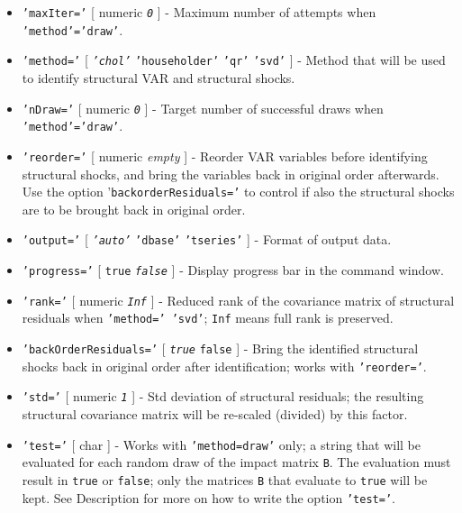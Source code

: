  \begin{itemize}
 \item
   \texttt{'maxIter='} {[} numeric \textbar{} \emph{\texttt{0}} {]} -
   Maximum number of attempts when \texttt{'method'='draw'}.
 \item
   \texttt{'method='} {[} \emph{\texttt{'chol'}} \textbar{}
   \texttt{'householder'} \textbar{} \texttt{'qr'} \textbar{}
   \texttt{'svd'} {]} - Method that will be used to identify structural
   VAR and structural shocks.
 \item
   \texttt{'nDraw='} {[} numeric \textbar{} \emph{\texttt{0}} {]} -
   Target number of successful draws when \texttt{'method'='draw'}.
 \item
   \texttt{'reorder='} {[} numeric \textbar{} \emph{empty} {]} - Reorder
   VAR variables before identifying structural shocks, and bring the
   variables back in original order afterwards. Use the option
   '\texttt{backorderResiduals='} to control if also the structural
   shocks are to be brought back in original order.
 \item
   \texttt{'output='} {[} \emph{\texttt{'auto'}} \textbar{}
   \texttt{'dbase'} \textbar{} \texttt{'tseries'} {]} - Format of output
   data.
 \item
   \texttt{'progress='} {[} \texttt{true} \textbar{}
   \emph{\texttt{false}} {]} - Display progress bar in the command
   window.
 \item
   \texttt{'rank='} {[} numeric \textbar{} \emph{\texttt{Inf}} {]} -
   Reduced rank of the covariance matrix of structural residuals when
   \texttt{'method=' 'svd'}; \texttt{Inf} means full rank is preserved.
 \item
   \texttt{'backOrderResiduals='} {[} \emph{\texttt{true}} \textbar{}
   \texttt{false} {]} - Bring the identified structural shocks back in
   original order after identification; works with \texttt{'reorder='}.
 \item
   \texttt{'std='} {[} numeric \textbar{} \emph{\texttt{1}} {]} - Std
   deviation of structural residuals; the resulting structural covariance
   matrix will be re-scaled (divided) by this factor.
 \item
   \texttt{'test='} {[} char {]} - Works with \texttt{'method=draw'}
   only; a string that will be evaluated for each random draw of the
   impact matrix \texttt{B}. The evaluation must result in \texttt{true}
   or \texttt{false}; only the matrices \texttt{B} that evaluate to
   \texttt{true} will be kept. See Description for more on how to write
   the option \texttt{'test='}.
 \end{itemize}
 
